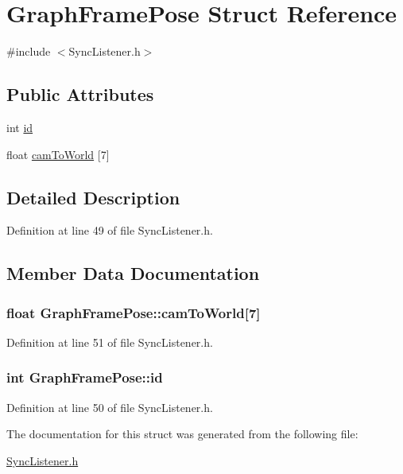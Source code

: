 \hypertarget{structGraphFramePose}{\section{\-Graph\-Frame\-Pose \-Struct \-Reference}
\label{structGraphFramePose}
}


{\ttfamily \#include $<$\-Sync\-Listener.\-h$>$}

\subsection*{\-Public \-Attributes}
\begin{DoxyCompactItemize}
\item 
int \hyperlink{structGraphFramePose_af26009f41d2371939bb44dfde237e328}{id}
\item 
float \hyperlink{structGraphFramePose_ab0c5dc065160c1baf8ee33320b3bb896}{cam\-To\-World} \mbox{[}7\mbox{]}
\end{DoxyCompactItemize}


\subsection{\-Detailed \-Description}


\-Definition at line 49 of file \-Sync\-Listener.\-h.



\subsection{\-Member \-Data \-Documentation}
\hypertarget{structGraphFramePose_ab0c5dc065160c1baf8ee33320b3bb896}{
\subsubsection[{cam\-To\-World}]{\setlength{\rightskip}{0pt plus 5cm}float {\bf \-Graph\-Frame\-Pose\-::cam\-To\-World}\mbox{[}7\mbox{]}}}\label{structGraphFramePose_ab0c5dc065160c1baf8ee33320b3bb896}


\-Definition at line 51 of file \-Sync\-Listener.\-h.

\hypertarget{structGraphFramePose_af26009f41d2371939bb44dfde237e328}{
\subsubsection[{id}]{\setlength{\rightskip}{0pt plus 5cm}int {\bf \-Graph\-Frame\-Pose\-::id}}}\label{structGraphFramePose_af26009f41d2371939bb44dfde237e328}


\-Definition at line 50 of file \-Sync\-Listener.\-h.



\-The documentation for this struct was generated from the following file\-:\begin{DoxyCompactItemize}
\item 
\hyperlink{SyncListener_8h}{\-Sync\-Listener.\-h}\end{DoxyCompactItemize}
